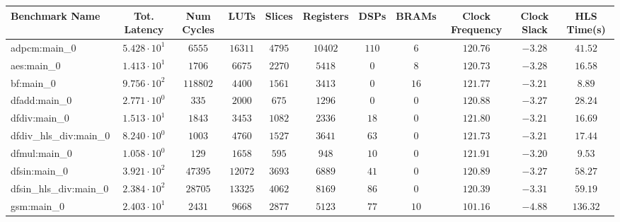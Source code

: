 \begin{tabular}{|l|c|c|c|c|c|c|c|c|c|c|}
\hline
Benchmark Name          & Tot. Latency           & Num Cycles & LUTs       & Slices    & Registers & DSPs    & BRAMs   & Clock Frequency & Clock Slack & HLS Time(s) \\
\hline
adpcm:main\_0           & $ 5.428 \cdot 10^{1} $ & $ 6555   $ & $ 16311  $ & $ 4795  $ & $ 10402 $ & $ 110 $ & $ 6   $ & $ 120.76      $ & $ -3.28   $ & $ 41.52   $ \\
aes:main\_0             & $ 1.413 \cdot 10^{1} $ & $ 1706   $ & $ 6675   $ & $ 2270  $ & $ 5418  $ & $ 0   $ & $ 8   $ & $ 120.73      $ & $ -3.28   $ & $ 16.58   $ \\
bf:main\_0              & $ 9.756 \cdot 10^{2} $ & $ 118802 $ & $ 4400   $ & $ 1561  $ & $ 3413  $ & $ 0   $ & $ 16  $ & $ 121.77      $ & $ -3.21   $ & $ 8.89    $ \\
dfadd:main\_0           & $ 2.771 \cdot 10^{0} $ & $ 335    $ & $ 2000   $ & $ 675   $ & $ 1296  $ & $ 0   $ & $ 0   $ & $ 120.88      $ & $ -3.27   $ & $ 28.24   $ \\
dfdiv:main\_0           & $ 1.513 \cdot 10^{1} $ & $ 1843   $ & $ 3453   $ & $ 1082  $ & $ 2336  $ & $ 18  $ & $ 0   $ & $ 121.80      $ & $ -3.21   $ & $ 16.69   $ \\
dfdiv\_hls\_div:main\_0 & $ 8.240 \cdot 10^{0} $ & $ 1003   $ & $ 4760   $ & $ 1527  $ & $ 3641  $ & $ 63  $ & $ 0   $ & $ 121.73      $ & $ -3.21   $ & $ 17.44   $ \\
dfmul:main\_0           & $ 1.058 \cdot 10^{0} $ & $ 129    $ & $ 1658   $ & $ 595   $ & $ 948   $ & $ 10  $ & $ 0   $ & $ 121.91      $ & $ -3.20   $ & $ 9.53    $ \\
dfsin:main\_0           & $ 3.921 \cdot 10^{2} $ & $ 47395  $ & $ 12072  $ & $ 3693  $ & $ 6889  $ & $ 41  $ & $ 0   $ & $ 120.89      $ & $ -3.27   $ & $ 58.27   $ \\
dfsin\_hls\_div:main\_0 & $ 2.384 \cdot 10^{2} $ & $ 28705  $ & $ 13325  $ & $ 4062  $ & $ 8169  $ & $ 86  $ & $ 0   $ & $ 120.39      $ & $ -3.31   $ & $ 59.19   $ \\
gsm:main\_0             & $ 2.403 \cdot 10^{1} $ & $ 2431   $ & $ 9668   $ & $ 2877  $ & $ 5123  $ & $ 77  $ & $ 10  $ & $ 101.16      $ & $ -4.88   $ & $ 136.32  $ \\

\end{tabular}
